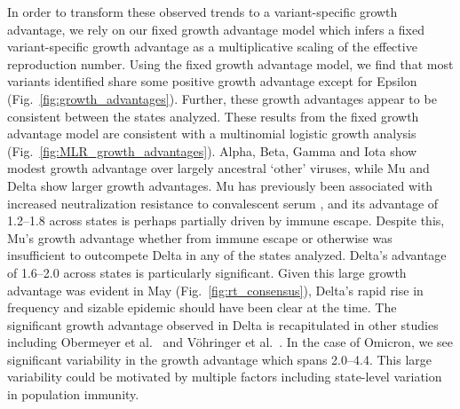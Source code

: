 \documentclass[11pt,oneside,letterpaper]{article}
\begin{document}
In order to transform these observed trends to a variant-specific growth advantage, we rely on our fixed growth advantage model which infers a fixed variant-specific growth advantage as a multiplicative scaling of the effective reproduction number.
Using the fixed growth advantage model, we find that most variants identified share some positive growth advantage except for Epsilon (Fig.\ \ref{fig:growth_advantages}).
Further, these growth advantages appear to be consistent between the states analyzed.
These results from the fixed growth advantage model are consistent with a multinomial logistic growth analysis (Fig.\ \ref{fig:MLR_growth_advantages}).
Alpha, Beta, Gamma and Iota show modest growth advantage over largely ancestral `other' viruses, while Mu and Delta show larger growth advantages.
Mu has previously been associated with increased neutralization resistance to convalescent serum \cite{Uriu2021}, and its advantage of 1.2--1.8 across states is perhaps partially driven by immune escape.
Despite this, Mu's growth advantage whether from immune escape or otherwise was insufficient to outcompete Delta in any of the states analyzed.
Delta's advantage of 1.6--2.0 across states is particularly significant.
Given this large growth advantage was evident in May (Fig.\ \ref{fig:rt_consensus}), Delta's rapid rise in frequency and sizable epidemic should have been clear at the time.
The significant growth advantage observed in Delta is recapitulated in other studies including Obermeyer et al.\ \cite{Obermeyer2021} and V\"ohringer et al.\ \cite{vohringer2021genomic}.
In the case of Omicron, we see significant variability in the growth advantage which spans 2.0--4.4.
This large variability could be motivated by multiple factors including state-level variation in population immunity.
\end{document}

